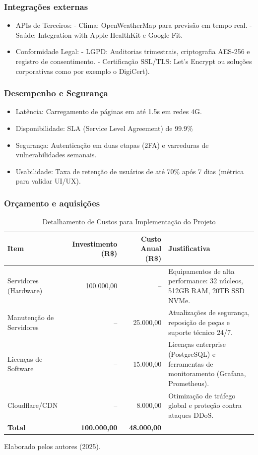 \documentclass[a4paper, 12pt]{article}
\begin{document}
\subsubsection{Integrações externas}
\begin{itemize}[]
\item APIs de Terceiros:
- Clima: OpenWeatherMap para previsão em tempo real.
- Saúde: Integration with Apple HealthKit e Google Fit.
\item Conformidade Legal:
- LGPD: Auditorias trimestrais, criptografia AES-256 e registro de consentimento.
- Certificação SSL/TLS: Let's Encrypt ou soluções corporativas como por exemplo o DigiCert).
\end{itemize}

\subsubsection*{Desempenho e Segurança}
\begin{itemize}[]
\item Latência: Carregamento de páginas em até 1.5s em redes 4G.
\item Disponibilidade: SLA (Service Level Agreement) de 99.9\% 
\item Segurança: Autenticação em duas etapas (2FA) e varreduras de vulnerabilidades semanais.
\item Usabilidade: Taxa de retenção de usuários de até 70\% após 7 dias (métrica para validar UI/UX).
\end{itemize}

\subsubsection{Orçamento e aquisições}
\begin{table}[h]
\centering
\caption{Detalhamento de Custos para Implementação do Projeto}
\label{tab:custos}
\begin{tabular}{@{} >{\raggedright}p{2.5cm} r r p{3.5cm} @{}}
\toprule
\textbf{Item} & \textbf{Investimento (R\$)} & \textbf{Custo Anual (R\$)} & \textbf{Justificativa} \\
\midrule
Servidores (Hardware) & 100.000,00 & -- & Equipamentos de alta performance: 32 núcleos, 512GB RAM, 20TB SSD NVMe. \\
\addlinespace
Manutenção de Servidores & -- & 25.000,00 & Atualizações de segurança, reposição de peças e suporte técnico 24/7. \\
\addlinespace
Licenças de Software & -- & 15.000,00 & Licenças enterprise (PostgreSQL) e ferramentas de monitoramento (Grafana, Prometheus). \\
\addlinespace
Cloudflare/CDN & -- & 8.000,00 & Otimização de tráfego global e proteção contra ataques DDoS. \\
\bottomrule
\textbf{Total} & \textbf{100.000,00} & \textbf{48.000,00} & \\
\bottomrule
\end{tabular}

\smallskip
Elaborado pelos autores (2025).
\end{table}
\end{document}
